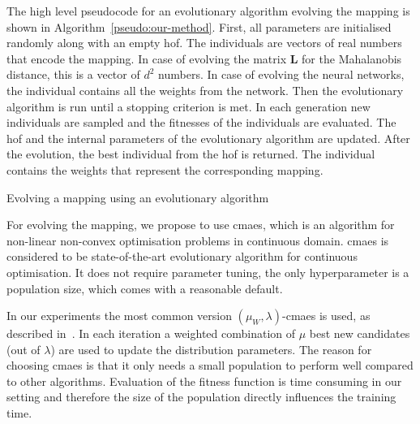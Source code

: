 \documentclass[12pt,a4paper]{report}
\begin{document}
The high level pseudocode for an evolutionary algorithm evolving the mapping is shown in Algorithm~\ref{pseudo:our-method}. First, all parameters are initialised randomly along with an empty \ac{hof}. The individuals are vectors of real numbers that encode the mapping. In case of evolving the matrix $\bm{L}$ for the Mahalanobis distance, this is a vector of $d^2$ numbers. In case of evolving the neural networks, the individual contains all the weights from the network. Then the evolutionary algorithm is run until a stopping criterion is met. In each generation new individuals are sampled and the fitnesses of the individuals are evaluated. The \ac{hof} and the internal parameters of the evolutionary algorithm are updated. After the evolution, the best individual from the \ac{hof} is returned. The individual contains the weights that represent the corresponding mapping.

\begin{algorithm}[t]
\caption{Evolving a mapping using an evolutionary algorithm} \label{pseudo:our-method}
\DontPrintSemicolon
\LinesNumbered
{}
\end{algorithm} 

For evolving the mapping, we propose to use \ac{cmaes}, which is an algorithm for non-linear non-convex optimisation problems in continuous domain. \ac{cmaes} is considered to be state-of-the-art evolutionary algorithm for continuous optimisation. It does not require parameter tuning, the only hyperparameter is a population size, which comes with a reasonable default.

In our experiments the most common version $(\mu_W, \lambda)$-\ac{cmaes} is used, as described in~\citep{hansen2001completely}. In each iteration a weighted combination of $\mu$ best new candidates (out of $\lambda$) are used to update the distribution parameters. The reason for choosing \ac{cmaes} is that it only needs a small population to perform well compared to other algorithms. Evaluation of the fitness function is time consuming in our setting and therefore the size of the population directly influences the training time.
\end{document}
